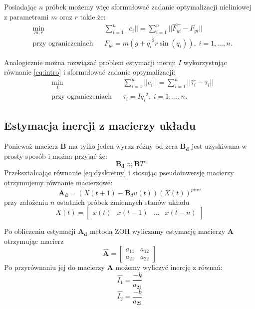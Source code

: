 \documentclass[a4paper, 10pt]{article}
\begin{document}
Posiadając $n$ próbek możemy więc sformułować zadanie optymalizacji nieliniowej z parametrami $m$ oraz $r$ takie że:
\begin{equation}
\begin{aligned}
& \underset{m, r}{\text{min}}
& & \sum_{i = 1}^{n} || e_i || = \sum_{i = 1}^{n} || \hat{F_{yi}} - F_{yi} || \\
& \text{przy ograniczeniach}
& & F_{yi} = m(g + \dot{q_i}^2r\sin{(q_i)}), \; i = 1, \ldots, n.
\end{aligned}
\end{equation}

Analogicznie można rozwiązać problem estymacji inercji $I$ wykorzystując równanie \ref{eq:intro} i sformułować zadanie optymalizacji:
\begin{equation}
\begin{aligned}
& \underset{I}{\text{min}}
& & \sum_{i = 1}^{n} || e_i || = \sum_{i = 1}^{n} || \hat{\tau_{i}} - \tau_{i} || \\
& \text{przy ograniczeniach}
& & \tau_{i} = I\ddot{q_i}^2, \; i = 1, \ldots, n.
\end{aligned}
\end{equation}

\subsection{Estymacja inercji z macierzy układu}
\label{sec:pos}
Ponieważ macierz $\mathbf{B}$ ma tylko jeden wyraz różny od zera $\mathbf{B_d}$ jest uzyskiwana w prosty sposób i można przyjąć że:
\begin{equation}
\mathbf{B_d} \approx \mathbf{B}T
\end{equation}
Przekształcając równanie \ref{eq:dyskretny} i stosując pseudoinwersję macierzy otrzymujemy równanie macierzowe:
\begin{equation}
\mathbf{A_d} = (X(t+1) - \mathbf{B}_du(t))(X(t))^{pinv}
\label{eq:pinv}
\end{equation}
przy założeniu $n$ ostatnich próbek zmiennych stanów układu
\begin{equation}
X(t) = 	\begin{bmatrix}
x(t) & x(t-1)  & ... & x(t-n)
\end{bmatrix}
\label{eq:xk}
\end{equation}

Po obliczeniu estymacji $\mathbf{A_d}$ metodą ZOH wyliczamy estymację macierzy $\mathbf{A}$ otrzymując macierz
\begin{equation}
\mathbf{\hat{A}} = 	\begin{bmatrix}
a_{11} & a_{12}\\
a_{21} & a_{22}
\end{bmatrix}
\end{equation}
Po przyrównaniu jej do macierzy $\mathbf{A}$ możemy wyliczyć inercję z równań:
\begin{equation}
\hat{I_1} = \frac{-k}{a_{21}}
\end{equation}
\begin{equation}
\hat{I_2} = \frac{-b}{a_{22}}
\end{equation}
\end{document}
